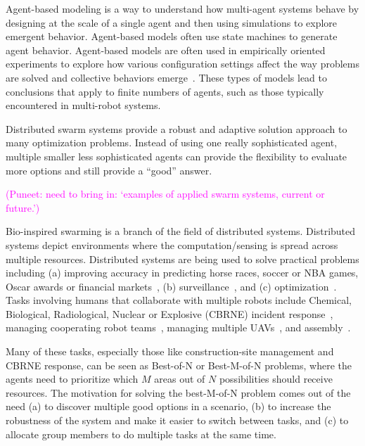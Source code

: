 \documentclass[openacc]{rsproca_new}%
\newcommand{\pj}[1]{\textcolor{magenta}{(Puneet: #1)}}
\begin{document}
Agent-based modeling is a way to understand how  multi-agent systems behave by designing at the scale of a single agent and then using simulations to explore emergent behavior. Agent-based models often use state machines to generate agent behavior. Agent-based models are often used in empirically oriented experiments to explore how various configuration settings affect the way problems are solved and collective behaviors emerge~\cite{dorigo2018ant,valentini_best-n_2017}. These types of models lead to conclusions that apply to finite numbers of agents, such as those typically encountered in multi-robot systems. 




Distributed swarm systems provide a robust and adaptive solution approach to many optimization problems. Instead of using one really sophisticated agent, multiple smaller less sophisticated agents can provide the flexibility to evaluate more options and still provide a “good” answer.


\pj{need to bring in: ‘examples of applied swarm systems, current or future.’}

Bio-inspired swarming is a branch of the field of distributed systems. Distributed systems depict environments where the computation/sensing is spread across multiple resources. Distributed systems are being used to solve practical problems including (a) improving accuracy in predicting horse races, soccer or NBA games, Oscar awards or financial markets~\cite{swarmAIpapers,swarmAI_socialoptima, swarmAI_vegas, swarmAI_finance},  (b) surveillance~\cite{valera2005intelligent}, and (c) optimization~\cite{rabbat2004distributed,dorigo1991distributed,boyd2011distributed,passino2002biomimicry}. Tasks involving humans that collaborate with multiple robots include Chemical, Biological, Radiological, Nuclear or Explosive (CBRNE) incident response~\cite{humphrey2009robotic}, managing cooperating robot teams~\cite{wang2007human}, managing multiple UAVs~\cite{cummings2007automation}, and assembly~\cite{chen2013optimal,caraballo2017block}.

Many of these tasks, especially those like construction-site management and CBRNE response, can be seen as  Best-of-N or Best-M-of-N problems, where the agents need to prioritize which $M$ areas out of $N$ possibilities should receive resources. The motivation for solving the best-M-of-N problem comes out of the need (a) to discover multiple good options in a scenario, (b) to increase the robustness of the system and make it easier to switch between tasks, and (c) to allocate group members to do multiple tasks at the same time.
\end{document}
